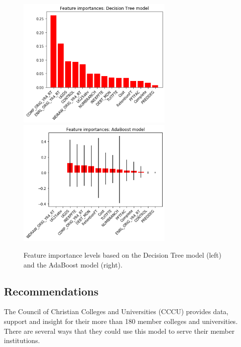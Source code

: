 \documentclass[11pt, letterpaper]{article}
\begin{document}
\begin{figure}[h]
\begin{center}
\includegraphics[width=3in]{DTFeatureImportance.png}
\includegraphics[width=3in]{ABFeatureImportance.png}

\caption{Feature importance levels based on the Decision Tree model (left) and the AdaBoost model (right).} 
\label{fig:Features}
\end{center}
\end{figure}

\subsection{Recommendations}
The Council of Christian Colleges and Universities (CCCU) provides data, support and insight for their more than 180 member colleges and universities. There are several ways that they could use this model to serve their member institutions.
\end{document}
